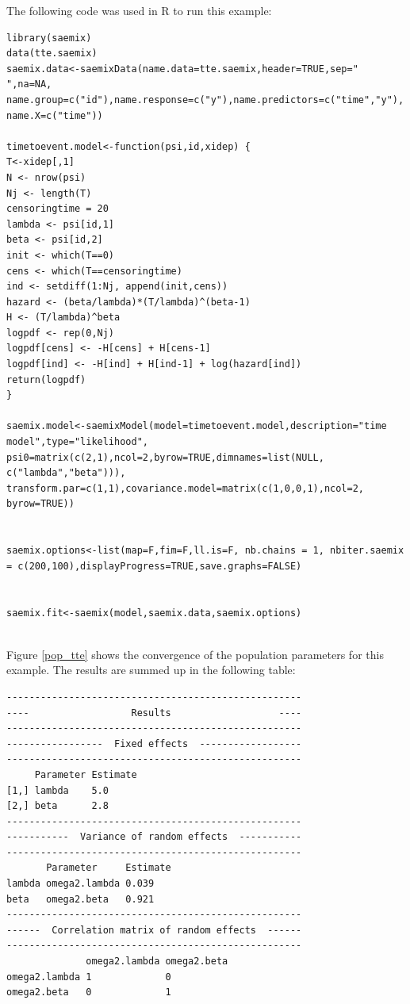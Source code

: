 The following code was used in R to run this example:

\begin{lstlisting}
library(saemix)
data(tte.saemix)
saemix.data<-saemixData(name.data=tte.saemix,header=TRUE,sep=" ",na=NA, name.group=c("id"),name.response=c("y"),name.predictors=c("time","y"), name.X=c("time"))

timetoevent.model<-function(psi,id,xidep) {
T<-xidep[,1]
N <- nrow(psi)
Nj <- length(T)
censoringtime = 20
lambda <- psi[id,1]
beta <- psi[id,2]
init <- which(T==0)
cens <- which(T==censoringtime)
ind <- setdiff(1:Nj, append(init,cens))
hazard <- (beta/lambda)*(T/lambda)^(beta-1)
H <- (T/lambda)^beta
logpdf <- rep(0,Nj)
logpdf[cens] <- -H[cens] + H[cens-1]
logpdf[ind] <- -H[ind] + H[ind-1] + log(hazard[ind])
return(logpdf)
}

saemix.model<-saemixModel(model=timetoevent.model,description="time model",type="likelihood",
psi0=matrix(c(2,1),ncol=2,byrow=TRUE,dimnames=list(NULL,
c("lambda","beta"))),
transform.par=c(1,1),covariance.model=matrix(c(1,0,0,1),ncol=2,
byrow=TRUE))


saemix.options<-list(map=F,fim=F,ll.is=F, nb.chains = 1, nbiter.saemix = c(200,100),displayProgress=TRUE,save.graphs=FALSE)


saemix.fit<-saemix(model,saemix.data,saemix.options)


\end{lstlisting}

Figure \ref{pop_tte} shows the convergence of the population parameters for this example. The results are summed up in the following table:

\begin{lstlisting}
----------------------------------------------------
----                  Results                   ----
----------------------------------------------------
-----------------  Fixed effects  ------------------
----------------------------------------------------
     Parameter Estimate
[1,] lambda    5.0     
[2,] beta      2.8     
----------------------------------------------------
-----------  Variance of random effects  -----------
----------------------------------------------------
       Parameter     Estimate
lambda omega2.lambda 0.039   
beta   omega2.beta   0.921   
----------------------------------------------------
------  Correlation matrix of random effects  ------
----------------------------------------------------
              omega2.lambda omega2.beta
omega2.lambda 1             0          
omega2.beta   0             1 
\end{lstlisting}



